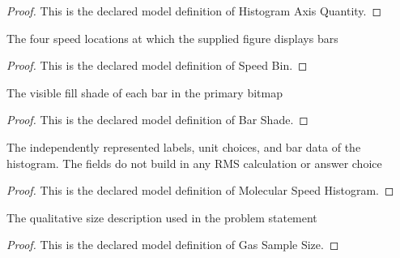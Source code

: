 \begin{proof}
  This is the declared model definition of Histogram Axis Quantity.
\end{proof}
\begin{definition}
  \label{def:physics:phyx-mini-0378:phyxminiproblems-problemphyxmini0378-speedbin}
  The four speed locations at which the supplied figure displays bars
\end{definition}
\begin{proof}
  This is the declared model definition of Speed Bin.
\end{proof}
\begin{definition}
  \label{def:physics:phyx-mini-0378:phyxminiproblems-problemphyxmini0378-barshade}
  The visible fill shade of each bar in the primary bitmap
\end{definition}
\begin{proof}
  This is the declared model definition of Bar Shade.
\end{proof}
\begin{definition}
  \label{def:physics:phyx-mini-0378:phyxminiproblems-problemphyxmini0378-molecularspeedhistogram}
  The independently represented labels, unit choices, and bar data of the histogram. The fields do not build in any RMS calculation or answer choice
\end{definition}
\begin{proof}
  This is the declared model definition of Molecular Speed Histogram.
\end{proof}
\begin{definition}
  \label{def:physics:phyx-mini-0378:phyxminiproblems-problemphyxmini0378-gassamplesize}
  The qualitative size description used in the problem statement
\end{definition}
\begin{proof}
  This is the declared model definition of Gas Sample Size.
\end{proof}
